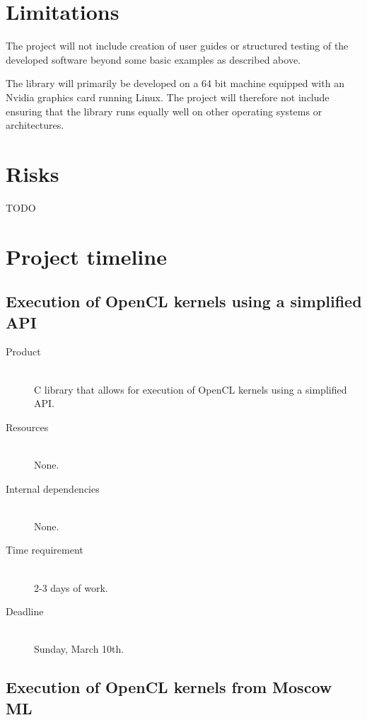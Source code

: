 \documentclass[a4paper, 10pt]{article}
\begin{document}
\section{Limitations}

The project will not include creation of user guides or structured
testing of the developed software beyond some basic examples as
described above.

The library will primarily be developed on a 64 bit machine equipped
with an Nvidia graphics card running Linux. The project will therefore
not include ensuring that the library runs equally well on other
operating systems or architectures.

\section{Risks}

TODO

\section{Project timeline}

\subsection{Execution of OpenCL kernels using a simplified API}
\label{sec:clibrary}

\begin{description}
  \item[Product] \hfill \\
    C library that allows for execution of OpenCL kernels using a
    simplified API.
  \item[Resources] \hfill \\
    None.
  \item[Internal dependencies] \hfill \\
    None.
  \item[Time requirement] \hfill \\
    2-3 days of work.
  \item[Deadline] \hfill \\
    Sunday, March 10th.
\end{description}

\subsection{Execution of OpenCL kernels from Moscow ML}
\label{sec:mosmlffi}
\end{document}
